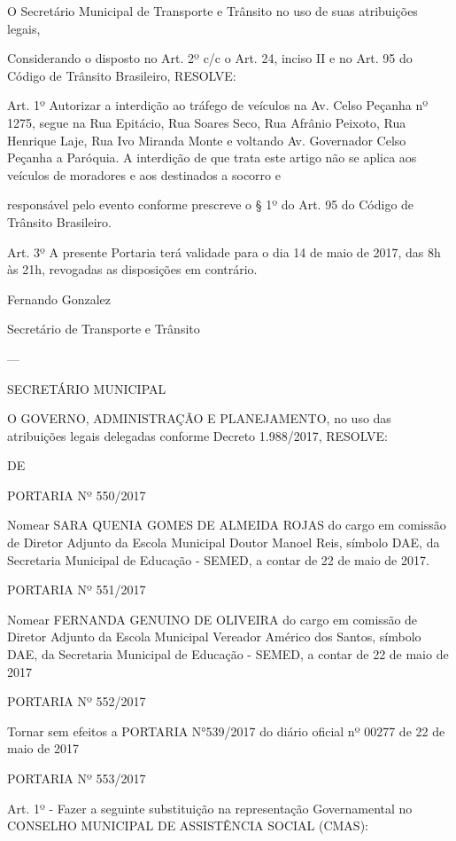 \documentclass{doliberto}
\begin{document}
 
O Secretário Municipal de Transporte e Trânsito no uso 
de suas atribuições legais,  
 
Considerando o disposto no Art. 2º c/c o Art. 24, inciso II e 
no Art. 95 do Código de Trânsito Brasileiro,  
RESOLVE:  
 
Art. 1º Autorizar a interdição ao tráfego de veículos na Av. 
Celso Peçanha  nº 1275, segue  na Rua Epitácio, Rua Soares 
Seco,  Rua  Afrânio  Peixoto,  Rua  Henrique  Laje,  Rua  Ivo 
Miranda Monte e voltando Av. Governador Celso Peçanha a 
Paróquia. A interdição de que trata este artigo não se aplica 
aos  veículos  de  moradores  e  aos  destinados  a  socorro  e 
 

responsável pelo evento conforme prescreve o § 1º do 
Art. 95 do Código de Trânsito Brasileiro.  
 
Art. 3º A presente Portaria terá validade para o dia 14 de 
maio de 2017, das 8h às 21h, revogadas as disposições em 
contrário. 
 
 

Fernando Gonzalez 

Secretário de Transporte e Trânsito 

---

SECRETÁRIO  MUNICIPAL 

 
O 
GOVERNO, 
ADMINISTRAÇÃO  E  PLANEJAMENTO,  no  uso  das 
atribuições legais delegadas conforme Decreto 1.988/2017, 
RESOLVE: 
 
DE 

PORTARIA Nº 550/2017 
 
Nomear  SARA  QUENIA  GOMES  DE  ALMEIDA  ROJAS  do 
cargo  em  comissão  de  Diretor  Adjunto  da  Escola 
Municipal  Doutor  Manoel  Reis,  símbolo  DAE,  da 
Secretaria Municipal de Educação - SEMED, a contar de 22 
de maio de 2017. 
 
PORTARIA Nº 551/2017 
 
Nomear FERNANDA GENUINO DE OLIVEIRA do cargo em 
comissão  de  Diretor  Adjunto  da  Escola  Municipal 
Vereador  Américo  dos  Santos,  símbolo  DAE,  da 
Secretaria Municipal de Educação - SEMED, a contar de 22 
de maio de 2017 
 
PORTARIA Nº 552/2017 
 
Tornar  sem  efeitos  a  PORTARIA  N°539/2017  do  diário 
oficial nº 00277 de 22 de maio de 2017 
 
PORTARIA Nº 553/2017 
 
Art. 1º - Fazer a seguinte substituição na representação 
Governamental no CONSELHO MUNICIPAL DE 
ASSISTÊNCIA SOCIAL (CMAS):  
 
\end{document}
